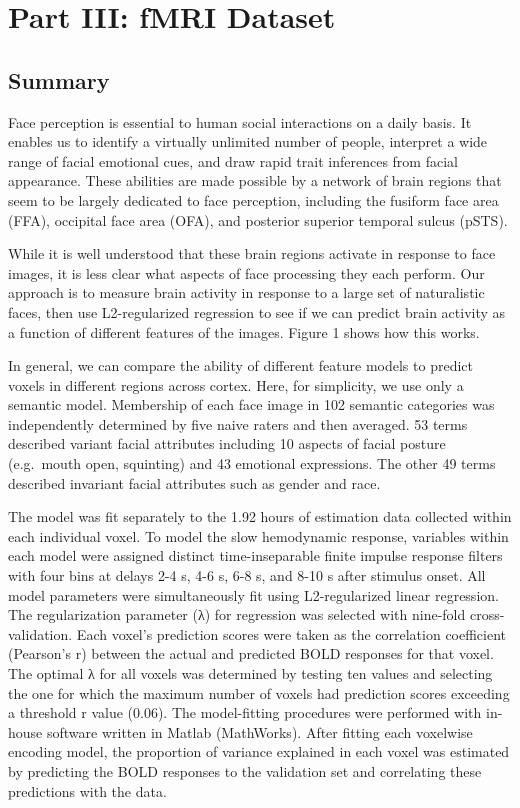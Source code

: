 \documentclass{article}
\begin{document}
    \section{Part III: fMRI Dataset}\label{part-iii-fmri-dataset}

\subsection{Summary}

Face perception is essential to human social interactions on a daily
basis. It enables us to identify a virtually unlimited number of people,
interpret a wide range of facial emotional cues, and draw rapid trait
inferences from facial appearance. These abilities are made possible by
a network of brain regions that seem to be largely dedicated to face
perception, including the fusiform face area (FFA), occipital face area
(OFA), and posterior superior temporal sulcus (pSTS).

While it is well understood that these brain regions activate in
response to face images, it is less clear what aspects of face
processing they each perform. Our approach is to measure brain activity
in response to a large set of naturalistic faces, then use
L2-regularized regression to see if we can predict brain activity as a
function of different features of the images. Figure 1 shows how this
works.

In general, we can compare the ability of different feature models to
predict voxels in different regions across cortex. Here, for simplicity,
we use only a semantic model. Membership of each face image in 102
semantic categories was independently determined by five naive raters
and then averaged. 53 terms described variant facial attributes
including 10 aspects of facial posture (e.g.~mouth open, squinting) and
43 emotional expressions. The other 49 terms described invariant facial
attributes such as gender and race.

The model was fit separately to the 1.92 hours of estimation data
collected within each individual voxel. To model the slow hemodynamic
response, variables within each model were assigned distinct
time-inseparable finite impulse response filters with four bins at
delays 2-4 s, 4-6 s, 6-8 s, and 8-10 s after stimulus onset. All model
parameters were simultaneously fit using L2-regularized linear
regression. The regularization parameter (λ) for regression was selected
with nine-fold cross-validation. Each voxel's prediction scores were
taken as the correlation coefficient (Pearson's r) between the actual
and predicted BOLD responses for that voxel. The optimal λ for all
voxels was determined by testing ten values and selecting the one for
which the maximum number of voxels had prediction scores exceeding a
threshold r value (0.06). The model-fitting procedures were performed
with in-house software written in Matlab (MathWorks). After fitting each
voxelwise encoding model, the proportion of variance explained in each
voxel was estimated by predicting the BOLD responses to the validation
set and correlating these predictions with the data.
\end{document}
